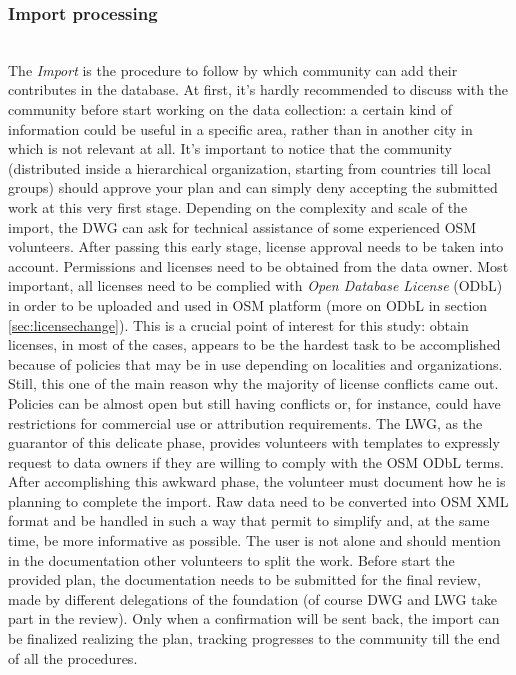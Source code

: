 \subsubsection{Import processing}~\\ \newline
The \textit{Import} is the procedure to follow by which community can add their contributes in the database.
At first, it's hardly recommended to discuss with the community before start working on the data collection: a certain kind of information could be useful in a specific area, rather than in another city in which is not relevant at all. It's important to notice that the community (distributed inside a hierarchical organization, starting from countries till local groups) should approve your plan and can simply deny accepting the submitted work at this very first stage.
Depending on the complexity and scale of the import, the DWG can ask for technical assistance of some experienced OSM volunteers.
After passing this early stage, license approval needs to be taken into account. Permissions and licenses need to be obtained from the data owner. Most important, all licenses need to be complied with \textit{Open Database License} (ODbL) in order to be uploaded and used in OSM platform (more on ODbL in section \ref{sec:licensechange}).  
This is a crucial point of interest for this study: obtain licenses, in most of the cases, appears to be the hardest task to be accomplished because of policies that may be in use depending on localities and organizations. Still, this one of the main reason why the majority of license conflicts came out. Policies can be almost open but still having conflicts or, for instance, could have restrictions for commercial use or attribution requirements.
The LWG, as the guarantor of this delicate phase, provides volunteers with templates to expressly request to data owners if they are willing to comply with the OSM ODbL terms.
After accomplishing this awkward phase, the volunteer must document how he is planning to complete the import. Raw data need to be converted into OSM XML format and be handled in such a way that permit to simplify and, at the same time, be more informative as possible. The user is not alone and should mention in the documentation other volunteers to split the work.
Before start the provided plan, the documentation needs to be submitted for the final review, made by different delegations of the foundation (of course DWG and LWG take part in the review). Only when a confirmation will be sent back, the import can be finalized realizing the plan, tracking progresses to the community till the end of all the procedures.